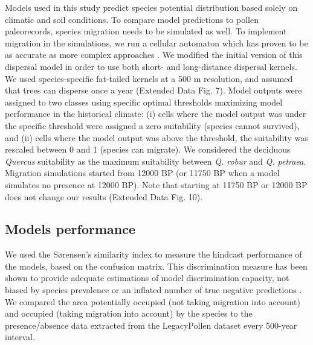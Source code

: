 \documentclass[pdflatex, sn-nature]{sn-jnl}%
\begin{document}
Models used in this study predict species potential distribution based solely on climatic and soil conditions. To compare model predictions to pollen paleorecords, species migration needs to be simulated as well. To implement migration in the simulations, we run a  cellular automaton \cite{Engler2012} which has proven to be as accurate as more complex approaches \cite{Zurell2016}. We modified the initial version of this dispersal model in order to use both short- and long-distance dispersal kernels. We used species-specific fat-tailed kernels \cite{Zani2022} at a 500 m resolution, and assumed that trees can disperse once a year (Extended Data Fig. 7). Model outputs were assigned to two classes using specific optimal thresholds maximizing model performance in the historical climate: (i) cells where the model output was under the specific threshold were assigned a zero suitability (species cannot survived), and (ii) cells where the  model output was above the threshold, the suitability was rescaled between 0 and 1 (species can migrate). We considered the deciduous \emph{Quercus} suitability as the maximum suitability between \emph{Q. robur} and \emph{Q. petraea}. Migration simulations started from 12000 BP (or 11750 BP when a model simulates no presence at 12000 BP). Note that starting at 11750 BP or 12000 BP does not change our results (Extended Data Fig. 10).

\subsection{Models performance}\label{skill}

We used the Sørensen's similarity index to measure the hindcast performance of the models, based on the confusion matrix. This discrimination measure has been shown to provide adequate estimations of model discrimination capacity,  not biased by species prevalence or an inflated number of true negative predictions \cite{Leroy2018}. We compared the area potentially occupied (not taking migration into account) and occupied (taking migration into account) by the species to the presence/absence data extracted from the LegacyPollen dataset every 500-year interval.
\end{document}
